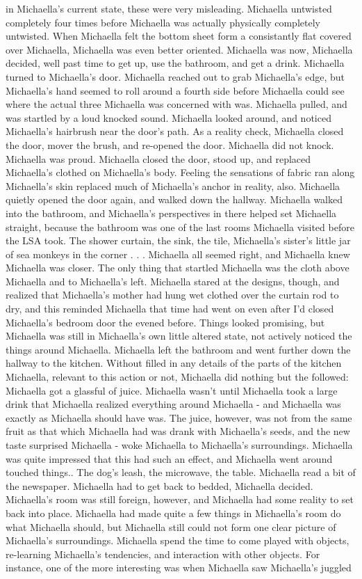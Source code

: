 \documentclass[12pt]{book}
\begin{document}
in Michaella's current state, these were very misleading. Michaella untwisted completely four times before Michaella was actually physically completely untwisted. When Michaella felt the bottom sheet form a consistantly flat covered over Michaella, Michaella was even better oriented. Michaella was now, Michaella decided, well past time to get up, use the bathroom, and get a drink. Michaella turned to Michaella's door. Michaella reached out to grab Michaella's edge, but Michaella's hand seemed to roll around a fourth side before Michaella could see where the actual three Michaella was concerned with was. Michaella pulled, and was startled by a loud knocked sound. Michaella looked around, and noticed Michaella's hairbrush near the door's path. As a reality check, Michaella closed the door, mover the brush, and re-opened the door. Michaella did not knock. Michaella was proud. Michaella closed the door, stood up, and replaced Michaella's clothed on Michaella's body. Feeling the sensations of fabric ran along Michaella's skin replaced much of Michaella's anchor in reality, also. Michaella quietly opened the door again, and walked down the hallway. Michaella walked into the bathroom, and Michaella's perspectives in there helped set Michaella straight, because the bathroom was one of the last rooms Michaella visited before the LSA took. The shower curtain, the sink, the tile, Michaella's sister's little jar of sea monkeys in the corner . . .  Michaella all seemed right, and Michaella knew Michaella was closer. The only thing that startled Michaella was the cloth above Michaella and to Michaella's left. Michaella stared at the designs, though, and realized that Michaella's mother had hung wet clothed over the curtain rod to dry, and this reminded Michaella that time had went on even after I'd closed Michaella's bedroom door the evened before. Things looked promising, but Michaella was still in Michaella's own little altered state, not actively noticed the things around Michaella. Michaella left the bathroom and went further down the hallway to the kitchen. Without filled in any details of the parts of the kitchen Michaella, relevant to this action or not, Michaella did nothing but the followed: Michaella got a glassful of juice. Michaella wasn't until Michaella took a large drink that Michaella realized everything around Michaella - and Michaella was exactly as Michaella should have was. The juice, however, was not from the same fruit as that which Michaella had was drank with Michaella's seeds, and the new taste surprised Michaella - woke Michaella to Michaella's surroundings. Michaella was quite impressed that this had such an effect, and Michaella went around touched things.. The dog's leash, the microwave, the table. Michaella read a bit of the newspaper. Michaella had to get back to bedded, Michaella decided. Michaella's room was still foreign, however, and Michaella had some reality to set back into place. Michaella had made quite a few things in Michaella's room do what Michaella should, but Michaella still could not form one clear picture of Michaella's surroundings. Michaella spend the time to come played with objects, re-learning Michaella's tendencies, and interaction with other objects. For instance, one of the more interesting was when Michaella saw Michaella's juggled 
\end{document}
